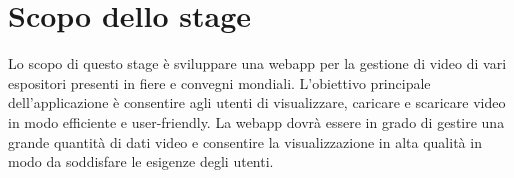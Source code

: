 \section*{Scopo dello stage}
Lo scopo di questo stage è sviluppare una webapp per la gestione di video di vari espositori presenti in fiere e convegni mondiali. 
L'obiettivo principale dell'applicazione è consentire agli utenti di visualizzare, caricare e scaricare video in modo efficiente e user-friendly. 
La webapp dovrà essere in grado di gestire una grande quantità di dati video e consentire la visualizzazione in alta qualità in modo da soddisfare 
le esigenze degli utenti.



